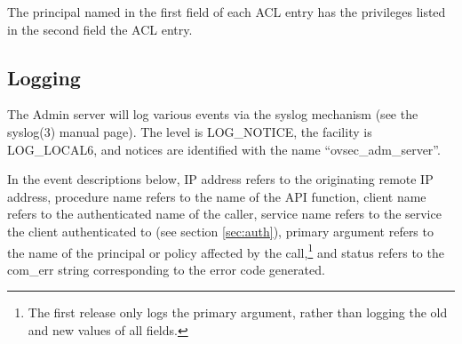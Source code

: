 The principal named in the first field of each ACL entry has the
privileges listed in the second field the ACL entry.

\subsection{Logging}

The Admin server will log various events via the syslog mechanism (see
the syslog(3) manual page).  The level is LOG_NOTICE, the facility is
LOG_LOCAL6, and notices are identified with the name
``ovsec_adm_server''.

In the event descriptions below, IP address refers to the originating
remote IP address, procedure name refers to the name of the API
function, client name refers to the authenticated name of the caller,
service name refers to the service the client authenticated to (see
section \ref{sec:auth}), primary argument refers to the name of the
principal or policy affected by the call,\footnote{The first release
only logs the primary argument, rather than logging the old and new
values of all fields.} and status refers to the com_err string
corresponding to the error code generated.

